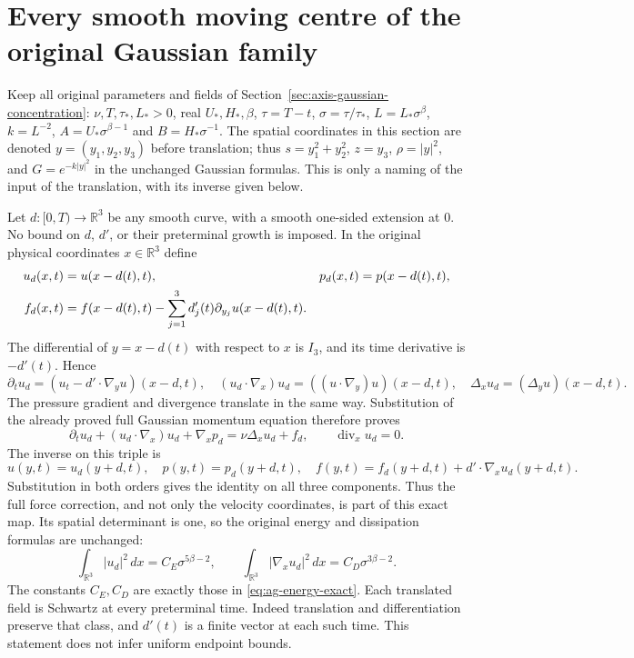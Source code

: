 \section{Every smooth moving centre of the original Gaussian family}
\label{sec:gt-moving-gaussian}

Keep all original parameters and fields of
Section~\ref{sec:axis-gaussian-concentration}:
$\nu,T,\tau_*,L_*>0$, real $U_*,H_*,\beta$,
$\tau=T-t$, $\sigma=\tau/\tau_*$, $L=L_*\sigma^\beta$,
$k=L^{-2}$, $A=U_*\sigma^{\beta-1}$ and $B=H_*\sigma^{-1}$.
The spatial coordinates in this section are denoted
$y=(y_1,y_2,y_3)$ before translation; thus $s=y_1^2+y_2^2$,
$z=y_3$, $\rho=|y|^2$, and $G=e^{-k|y|^2}$ in the unchanged
Gaussian formulas. This is only a naming of the input of the
translation, with its inverse given below.

Let $d:[0,T)\to\mathbb R^3$ be any smooth curve, with a smooth
one-sided extension at $0$. No bound on $d$, $d'$, or their
preterminal growth is imposed. In the original physical coordinates
$x\in\mathbb R^3$ define
\begin{align}
 u_d(x,t)&=u(x-d(t),t),&
 p_d(x,t)&=p(x-d(t),t),\notag\\
 f_d(x,t)&=f(x-d(t),t)
          -\sum_{j=1}^3d'_j(t)\partial_{y_j}u(x-d(t),t).
 \label{gt:translation}
\end{align}
The differential of $y=x-d(t)$ with respect to $x$ is $I_3$,
and its time derivative is $-d'(t)$. Hence
\[
 \partial_tu_d=(u_t-d'\cdot\nabla_yu)(x-d,t),\quad
 (u_d\cdot\nabla_x)u_d=((u\cdot\nabla_y)u)(x-d,t),\quad
 \Delta_xu_d=(\Delta_yu)(x-d,t).
\]
The pressure gradient and divergence translate in the same way.
Substitution of the already proved full Gaussian momentum equation
therefore proves
\[
 \partial_tu_d+(u_d\cdot\nabla_x)u_d+\nabla_xp_d
       =\nu\Delta_xu_d+f_d,\qquad \operatorname{div}_xu_d=0.
\]
The inverse on this triple is
\[
 u(y,t)=u_d(y+d,t),\quad p(y,t)=p_d(y+d,t),\quad
 f(y,t)=f_d(y+d,t)+d'\cdot\nabla_xu_d(y+d,t).
\]
Substitution in both orders gives the identity on all three
components. Thus the full force correction, and not only the
velocity coordinates, is part of this exact map.
Its spatial determinant is one, so the original energy and
dissipation formulas are unchanged:
\[
 \int_{\mathbb R^3}|u_d|^2\,dx=C_E\sigma^{5\beta-2},\qquad
 \int_{\mathbb R^3}|\nabla_xu_d|^2\,dx=C_D\sigma^{3\beta-2}.
\]
The constants $C_E,C_D$ are exactly those in
\eqref{eq:ag-energy-exact}. Each translated field is Schwartz at
every preterminal time. Indeed translation and differentiation
preserve that class, and $d'(t)$ is a finite vector at each such
time. This statement does not infer uniform endpoint bounds.

